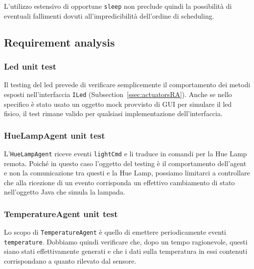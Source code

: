 \documentclass{../llncs}
\newcommand{\codescript}[1]{{\mbox{\small{\texttt{#1}}}}\xspace}
\newcommand{\xss}[1]{\subsectionname~\ref{ssec:#1}}
\newcommand{\labelsssec}[1]{\label{sssec:#1}}
\newcommand{\subsectionname}{Subsection}
\begin{document}
L'utilizzo estensivo di opportune \codescript{sleep} non preclude quindi la possibilità di eventuali fallimenti dovuti all'impredicibilità dell'ordine di scheduling.

\subsection{Requirement analysis}
\labelsssec{reqAnalTesting}

\subsubsection{Led unit test}
Il testing del led prevede di verificare semplicemente il comportamento dei metodi esposti nell'interfaccia \codescript{ILed} (\xss{actuatorsRA}). Anche se nello specifico è stato usato un oggetto mock provvisto di GUI per simulare il led fisico, il test rimane valido per qualsiasi implementazione dell'interfaccia.\\



\subsubsection{HueLampAgent unit test}
L'\codescript{HueLampAgent} riceve eventi \codescript{lightCmd} e li traduce in comandi per la Hue Lamp remota. Poiché in questo caso l'oggetto del testing è il comportamento dell'agent e non la comunicazione tra questi e la Hue Lamp, possiamo limitarci a controllare che alla ricezione di un evento corrisponda un effettivo cambiamento di stato nell'oggetto Java che simula la lampada.\\



\subsubsection{TemperatureAgent unit test}
Lo scopo di \codescript{TemperatureAgent} è quello di emettere periodicamente eventi \codescript{temperature}. Dobbiamo quindi verificare che, dopo un tempo ragionevole, questi siano stati effettivamente generati e che i dati sulla temperatura in essi contenuti corrispondano a quanto rilevato dal sensore.\\
\end{document}
